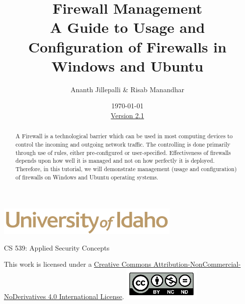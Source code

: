 \documentclass[12pt]{extarticle}
\begin{document}
\title{ Firewall Management\\ \normalsize A Guide to Usage and Configuration of Firewalls in Windows and Ubuntu}
\author{Ananth Jillepalli \& Risab Manandhar}
\date{\today \\ \hyperref[changelog]{Version 2.1}}
\renewcommand{\abstractname}{Summary}
\begin{titlepage}
\maketitle
{}
\begin{center}
\includegraphics[scale=.5]{UofI}

\large{CS 539: Applied Security Concepts}

\vskip 40pt

\end{center}
\begin{abstract}
A Firewall is a technological barrier which can be used in most computing devices to control the incoming and outgoing network traffic. The controlling is done primarily through use of rules, either pre-configured or user-specified. Effectiveness of firewalls depends upon how well it is managed and not on how perfectly it is deployed. Therefore, in this tutorial, we will demonstrate management (usage and configuration) of firewalls on Windows and Ubuntu operating systems.  
\end{abstract}


\vfill
\begin{center}
This work is licensed under a \href{https://creativecommons.org/licenses/by-nc-nd/2.0/}{Creative Commons Attribution-NonCommercial-NoDerivatives 4.0 International License}.
\vskip 10pt
\includegraphics[scale=.5]{cc}
\end{center}

\end{titlepage}


\pagebreak
\tableofcontents

\end{document}

